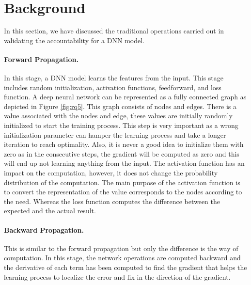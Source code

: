 \section{Background}
\label{sec:background}
In this section, we have discussed the traditional operations carried out in validating the accountability for a DNN model.
\paragraph{Forward Propagation.} In this stage, a DNN model learns the features from the input. This stage includes random initialization, activation functions, feedforward, and loss function. A deep neural network can be represented as a fully connected graph as depicted in Figure \ref{fig:rq5}. This graph consists of nodes and edges. There is a value associated with the nodes and edge, these values are initially randomly initialized to start the training process. This step is very important as a wrong initialization parameter can hamper the learning process and take a longer iteration to reach optimality. Also, it is never a good idea to initialize them with zero as in the consecutive steps, the gradient will be computed as zero and this will end up not learning anything from the input. The activation function has an impact on the computation, however, it does not change the probability distribution of the computation. The main purpose of the activation function is to convert the representation of the value corresponds to the nodes according to the need. Whereas the loss function computes the difference between the expected and the actual result.
\paragraph{Backward Propagation.} This is similar to the forward propagation but only the difference is the way of computation. In this stage, the network operations are computed backward and the derivative of each term has been computed to find the gradient that helps the learning process to localize the error and fix in the direction of the gradient.
